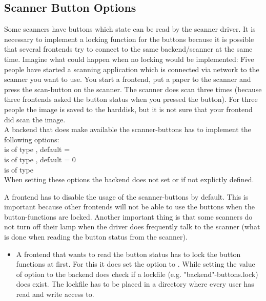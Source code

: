 \documentclass[11pt,DVIps]{report}
\begin{document}
\begin{changebar}
\subsection{Scanner Button Options}
Some scanners have buttons which state can be read by the scanner driver. 
It is necessary to implement a locking function for the buttons
because it is possible that several frontends try to connect to the
same backend/scanner at the same time. Imagine what could happen
when no locking would be implemented:
Five people have started a scanning application which is connected
via network to the scanner you want to use. You start a frontend,
put a paper to the scanner and press the scan-button on the scanner.
The scanner does scan three times (because three frontends asked the
button status when you pressed the button). For three people the
image is saved to the harddisk, but it is not sure that your
frontend did scan the image.\\

A backend that does make available the scanner-buttons has to
implement the following options:\\
 is of type , default = \\
 is of type , default = 0\\
 is of type \\
When setting these options the backend does not set 
or  if not explictly defined.

A frontend has to disable the usage of the scanner-buttons by default. This is important
because other frontends will not be able to use the buttons when the button-functions are locked.
Another important thing is that some scanners do not turn off their lamp when the driver
does frequently talk to the scanner (what is done when reading the button status from the scanner).

\begin{itemize}

\item
A frontend that wants to read the button status has to lock the
button functions at first. For this it does set the option
 to .
While setting the value of option  to 
the backend does check if a lockfile (e.g. "backend"-buttons.lock) does exist.
The lockfile has to be placed in a directory where every user has read and write access to.


\end{itemize}
\end{changebar}
\end{document}
